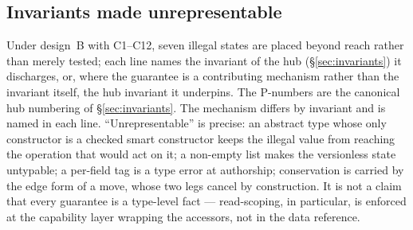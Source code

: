 \subsection{Invariants made unrepresentable}
\label{sec:sec04-unrep}

Under design~B with C1--C12, seven illegal states are placed beyond reach rather than
merely tested; each line names the invariant of the hub (\S\ref{sec:invariants}) it
discharges, or, where the guarantee is a contributing mechanism rather than the invariant
itself, the hub invariant it underpins. The P-numbers are the canonical hub numbering of
\S\ref{sec:invariants}. The mechanism differs by invariant and is named in each line. ``Unrepresentable'' is precise: an abstract
type whose only constructor is a checked smart constructor keeps the illegal value from
reaching the operation that would act on it; a non-empty list makes the versionless state
untypable; a per-field tag is a type error at authorship; conservation is carried by the edge
form of a move, whose two legs cancel by construction. It is not a claim that every guarantee
is a type-level fact --- read-scoping, in particular, is enforced at the capability layer
wrapping the accessors, not in the data reference.

